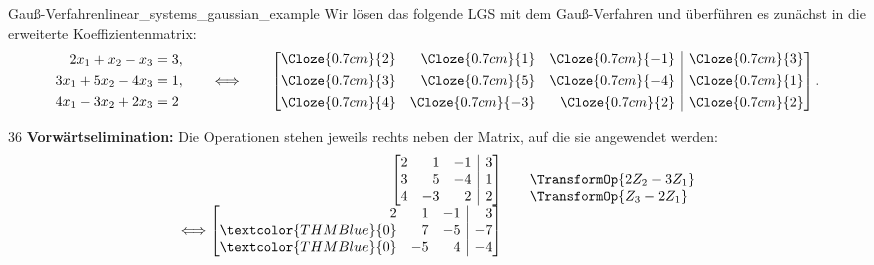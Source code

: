 \noindent\begin{minipage}{\linewidth}
\begin{ExampleBox}{Gauß-Verfahren}{linear_systems_gaussian_example}
  Wir lösen das folgende LGS mit dem Gauß-Verfahren und überführen es zunächst
  in die erweiterte Koeffizientenmatrix:
    \[
      \begin{aligned}
        2x_1+x_2-x_3&=3,\\
        3x_1+5x_2-4x_3&=1,\\
        4x_1-3x_2+2x_3&=2
      \end{aligned}
      \qquad\Longleftrightarrow\qquad
      \left[
        \begin{array}{@{}rrr|r@{}}
          \Cloze{0.7cm}{2}&\Cloze{0.7cm}{1}&\Cloze{0.7cm}{-1}&\Cloze{0.7cm}{3}\\[0.35em]
          \Cloze{0.7cm}{3}&\Cloze{0.7cm}{5}&\Cloze{0.7cm}{-4}&\Cloze{0.7cm}{1}\\[0.35em]
          \Cloze{0.7cm}{4}&\Cloze{0.7cm}{-3}&\Cloze{0.7cm}{2}&\Cloze{0.7cm}{2}
        \end{array}
      \right].
    \]
  \begin{ClozeArea}[34]{36}
    \textbf{Vorwärtselimination:} Die Operationen stehen jeweils rechts neben
    der Matrix, auf die sie angewendet werden:
    \[
      \begin{array}{r@{\;}r@{\qquad}l}
        &\left[\begin{array}{@{}rrr|r@{}}
          2& 1&-1& 3\\
          3& 5&-4& 1\\
          4&-3& 2& 2
        \end{array}\right]
        &\begin{array}{@{}l@{}}
          {}\\
          \smash{\TransformOp{2Z_2-3Z_1}}\\
          \smash{\TransformOp{Z_3-2Z_1}}
        \end{array}\\[1.0em]
        \Longleftrightarrow
        &\left[\begin{array}{@{}rrr|r@{}}
          2&1&-1& 3\\
          \textcolor{THMBlue}{0}&7&-5&-7\\
          \textcolor{THMBlue}{0}&-5&4&-4
        \end{array}\right]
        &\begin{array}{@{}l@{}}
          {}\\
          {}\\

\end{array}
\end{array}\]
\end{ClozeArea}
\end{ExampleBox}
\end{minipage}
